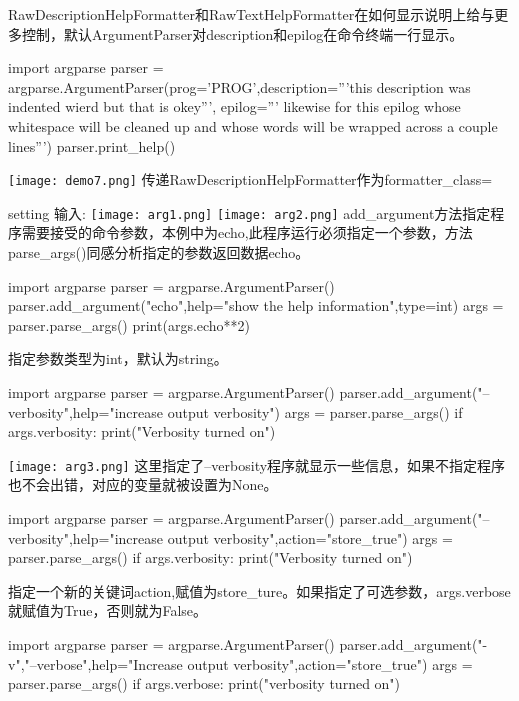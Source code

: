RawDescriptionHelpFormatter和RawTextHelpFormatter在如何显示说明上给与更多控制，默认ArgumentParser对description和epilog在命令终端一行显示。
\begin{python}
import argparse
parser = argparse.ArgumentParser(prog='PROG',description='''this
 description was indented wierd
but that is okey''',
epilog='''
likewise for this epilog whose whitespace will be
cleaned up and whose words will be wrapped
across a couple lines''')
parser.print_help()
\end{python}
\texttt{[image: demo7.png]}\newline
传递RawDescriptionHelpFormatter作为formatter\_class=
\begin{python}

\end{python}
setting
输入:\newline
\texttt{[image: arg1.png]}\newline
\texttt{[image: arg2.png]}\newline
add\_argument方法指定程序需要接受的命令参数，本例中为echo,此程序运行必须指定一个参数，方法parse\_args()同感分析指定的参数返回数据echo。
\begin{python}
import argparse
parser = argparse.ArgumentParser()
parser.add_argument("echo",help="show the help information",type=int)
args = parser.parse_args()
print(args.echo**2)
\end{python}
指定参数类型为int，默认为string。
\begin{python}
import argparse
parser = argparse.ArgumentParser()
parser.add_argument("--verbosity",help="increase output verbosity")
args = parser.parse_args()
if args.verbosity:
    print("Verbosity turned on")
\end{python}
\texttt{[image: arg3.png]}\newline
这里指定了--verbosity程序就显示一些信息，如果不指定程序也不会出错，对应的变量就被设置为None。
\begin{python}
import argparse
parser = argparse.ArgumentParser()
parser.add_argument("--verbosity",help="increase output verbosity",action="store_true")
args = parser.parse_args()
if args.verbosity:
    print("Verbosity turned on")
\end{python}
指定一个新的关键词action,赋值为store\_ture。如果指定了可选参数，args.verbose就赋值为True，否则就为False。
\begin{python}
import argparse
parser = argparse.ArgumentParser()
parser.add_argument("-v","--verbose",help="Increase output verbosity",action="store_true")
args = parser.parse_args()
if args.verbose:
    print("verbosity turned on")
\end{python}

